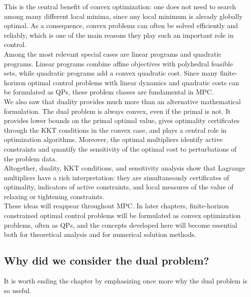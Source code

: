 This is the central benefit of convex optimization: one does not need to search among many
different local minima, since any local minimum is already globally optimal. As a consequence,
convex problems can often be solved efficiently and reliably, which is one of the main reasons
they play such an important role in control.\\
Among the most relevant special cases are linear programs and quadratic programs. Linear
programs combine affine objectives with polyhedral feasible sets, while quadratic programs add
a convex quadratic cost. Since many finite-horizon optimal control problems with linear dynamics
and quadratic costs can be formulated as QPs, these problem classes are fundamental in MPC.\\
We also saw that duality provides much more than an alternative mathematical formulation.
The dual problem is always convex, even if the primal is not. It provides lower bounds on the
primal optimal value, gives optimality certificates through the KKT conditions in the convex
case, and plays a central role in optimization algorithms. Moreover, the optimal multipliers
identify active constraints and quantify the sensitivity of the optimal cost to perturbations of
the problem data.\\
Altogether, duality, KKT conditions, and sensitivity analysis show that Lagrange multipliers
have a rich interpretation: they are simultaneously certificates of optimality, indicators of active
constraints, and local measures of the value of relaxing or tightening constraints.\\

These ideas will reappear throughout MPC. In later chapters, finite-horizon constrained optimal
control problems will be formulated as convex optimization problems, often as QPs, and the
concepts developed here will become essential both for theoretical analysis and for numerical
solution methods.

\subsection*{Why did we consider the dual problem?}

It is worth ending the chapter by emphasizing once more why the dual problem is so useful.\\

